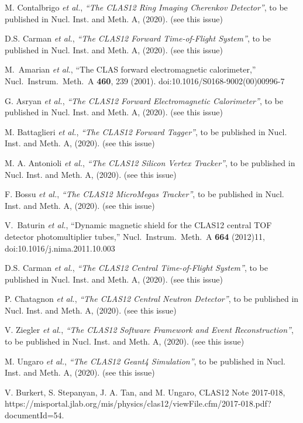 \documentclass[final,3p,twocolumn]{elsarticle}
\begin{document}
\begin{thebibliography}{99}
M. Contalbrigo {\it et al.}, {\it ``The CLAS12 Ring Imaging Cherenkov Detector''}, to be published in Nucl. Inst.
and Meth. A, (2020). (see this issue)

D.S. Carman {\it et al.}, {\it ``The CLAS12 Forward Time-of-Flight System''}, to be published in Nucl. Inst.
and Meth. A, (2020). (see this issue)

  M.~Amarian {\it et al.},
  ``The CLAS forward electromagnetic calorimeter,''
  Nucl.\ Instrum.\ Meth.\ A {\bf 460}, 239 (2001).
  doi:10.1016/S0168-9002(00)00996-7

G. Asryan {\it et al.}, {\it ``The CLAS12 Forward Electromagnetic Calorimeter''}, to be published in Nucl. Inst.
and Meth. A, (2020). (see this issue)

M. Battaglieri {\it et al.}, {\it ``The CLAS12 Forward Tagger''}, to be published in Nucl. Inst.
and Meth. A, (2020). (see this issue)

M. A. Antonioli {\it et al.}, {\it ``The CLAS12 Silicon Vertex Tracker''}, to be published in Nucl. Inst.
and Meth. A, (2020). (see this issue)

F. Bossu {\it et al.}, {\it ``The CLAS12 MicroMegas Tracker''}, to be published in Nucl. Inst.
and Meth. A, (2020). (see this issue)

  V.~Baturin {\it et al.},
  ``Dynamic magnetic shield for the CLAS12 central TOF detector photomultiplier tubes,''
  Nucl.\ Instrum.\ Meth.\ A {\bf 664} (2012)11, doi:10.1016/j.nima.2011.10.003

D.S. Carman {\it et al.}, {\it ``The CLAS12 Central Time-of-Flight System''}, to be published in Nucl. Inst.
and Meth. A, (2020). (see this issue)

P. Chatagnon {\it et al.}, {\it ``The CLAS12 Central Neutron Detector''}, to be published in Nucl. Inst.
and Meth. A, (2020). (see this issue)

  V. Ziegler {\it et al.}, {\it ``The CLAS12 Software Framework and Event Reconstruction''}, to be published in
  Nucl. Inst. and Meth. A, (2020). (see this issue)

M. Ungaro {\it et al.}, {\it ``The CLAS12 Geant4 Simulation''}, to be published in Nucl. Inst.
and Meth. A, (2020). (see this issue)

 V. Burkert, S. Stepanyan, J. A. Tan, and M. Ungaro, CLAS12 Note 2017-018, 
https://misportal.jlab.org/mis/physics/clas12/viewFile.cfm/2017-018.pdf?documentId=54. 


\end{thebibliography}
\end{document}
